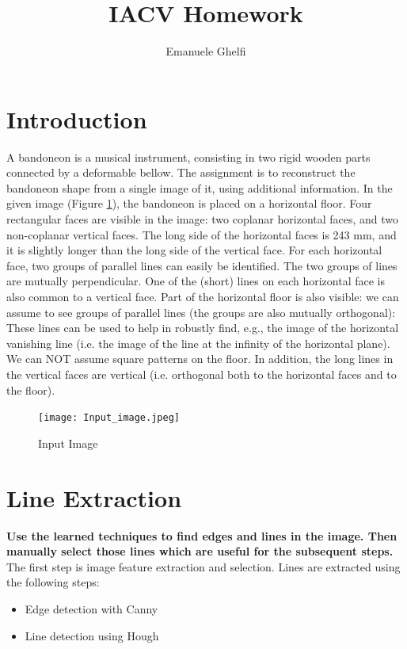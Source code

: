\documentclass[11pt, oneside]{article}   	%
\title{IACV Homework}
\author{Emanuele Ghelfi}
\affil{Politecnico di Milano}
\begin{document}
\maketitle

\pagebreak
\tableofcontents
\pagebreak
\section{Introduction}
A bandoneon is a musical instrument, consisting in two rigid wooden parts connected by a deformable bellow. The assignment is to reconstruct the bandoneon shape from a single image of it, using additional information.
In the given image (Figure \ref{inputimg}), the bandoneon is placed on a horizontal floor. Four rectangular faces are visible in the image: two coplanar horizontal faces, and two non-coplanar vertical faces. The long side of the horizontal faces is 243 mm, and it is slightly longer than the long side of the vertical face.
For each horizontal face, two groups of parallel lines can easily be identified. The two groups of lines are mutually perpendicular. One of the (short) lines on each horizontal face is also common to a vertical face. Part of the horizontal floor is also visible: we can assume to see groups of parallel lines (the groups are also mutually orthogonal): These lines can be used to help in robustly find, e.g., the image of the horizontal vanishing line (i.e. the image of the line at the infinity of the horizontal plane). We can NOT assume square patterns on the floor.
In addition, the long lines in the vertical faces are vertical (i.e. orthogonal both to the horizontal faces and to the floor).
\begin{figure}
\texttt{[image: Input\_image.jpeg]}
\caption{Input Image}
\label{inputimg}
\end{figure}

\section{Line Extraction}
\textbf{Use the learned techniques to find edges and lines in the image. Then manually select those lines which are useful for the subsequent steps.} \hfill \break
The first step is image feature extraction and selection. 
Lines are extracted using the following steps:
\begin{itemize}
\item Edge detection with Canny
\item Line detection using Hough

\end{itemize}
\end{document}
